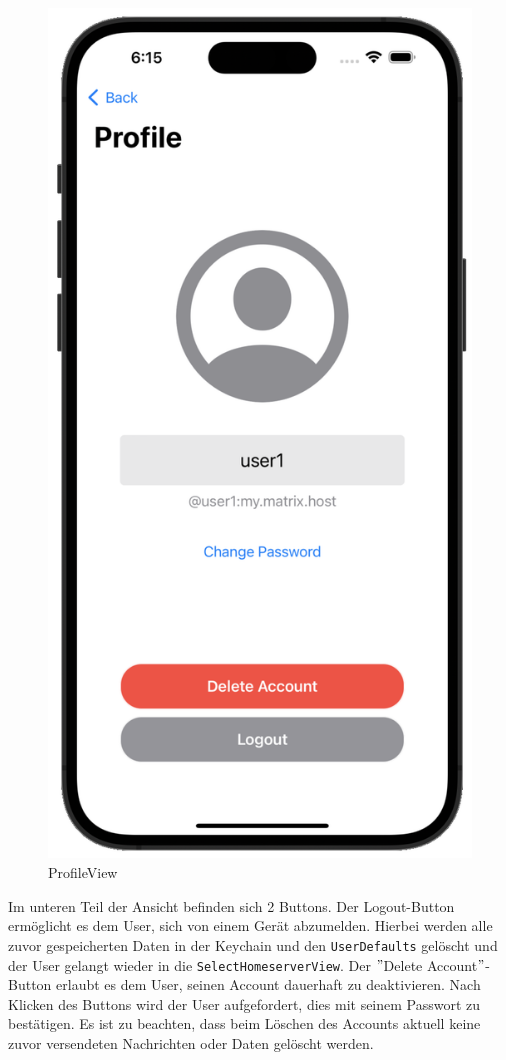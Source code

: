     \begin{figure}[h]
        \includegraphics[scale=0.5]{profile_white}
        \centering
        \caption{ProfileView}\label{fig:profileview}
    \end{figure}
    Im unteren Teil der Ansicht befinden sich 2 Buttons.
    Der Logout-Button ermöglicht es dem User, sich von einem Gerät abzumelden.
    Hierbei werden alle zuvor gespeicherten Daten in der Keychain und den \texttt{UserDefaults} gelöscht und der User gelangt wieder in die \texttt{SelectHomeserverView}.
    Der \("\)Delete Account\("\)-Button erlaubt es dem User, seinen Account dauerhaft zu deaktivieren.
    Nach Klicken des Buttons wird der User aufgefordert, dies mit seinem Passwort zu bestätigen.
    Es ist zu beachten, dass beim Löschen des Accounts aktuell keine zuvor versendeten Nachrichten oder Daten gelöscht werden.

